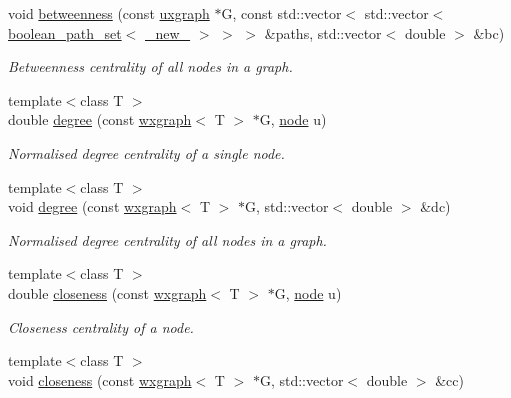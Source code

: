 \begin{DoxyCompactItemize}
void \hyperlink{namespacelgraph_1_1networks_1_1metrics_1_1centralities_ae8016a7511fd3982f986670283cc048c}{betweenness} (const \hyperlink{classlgraph_1_1uxgraph}{uxgraph} $\ast$G, const std\+::vector$<$ std\+::vector$<$ \hyperlink{namespacelgraph_afad432931ba600ab1628d5c9595986c5}{boolean\+\_\+path\+\_\+set}$<$ \hyperlink{namespacelgraph_a2836f966c1c36b43da337d8907728ec0}{\+\_\+new\+\_\+} $>$ $>$ $>$ \&paths, std\+::vector$<$ double $>$ \&bc)
\begin{DoxyCompactList}\small\item\em Betweenness centrality of all nodes in a graph. \end{DoxyCompactList}\item 
{\footnotesize template$<$class T $>$ }\\double \hyperlink{namespacelgraph_1_1networks_1_1metrics_1_1centralities_ab069253de07dc54020e9d6cc1a27a6c8}{degree} (const \hyperlink{classlgraph_1_1wxgraph}{wxgraph}$<$ T $>$ $\ast$G, \hyperlink{namespacelgraph_a397169dd66adf725210a30fb7251773e}{node} u)
\begin{DoxyCompactList}\small\item\em Normalised degree centrality of a single node. \end{DoxyCompactList}\item 
{\footnotesize template$<$class T $>$ }\\void \hyperlink{namespacelgraph_1_1networks_1_1metrics_1_1centralities_a20747beaa4dd97bc96cf153afecc464e}{degree} (const \hyperlink{classlgraph_1_1wxgraph}{wxgraph}$<$ T $>$ $\ast$G, std\+::vector$<$ double $>$ \&dc)
\begin{DoxyCompactList}\small\item\em Normalised degree centrality of all nodes in a graph. \end{DoxyCompactList}\item 
{\footnotesize template$<$class T $>$ }\\double \hyperlink{namespacelgraph_1_1networks_1_1metrics_1_1centralities_a641608dcaecba5d3636237bd15da2e96}{closeness} (const \hyperlink{classlgraph_1_1wxgraph}{wxgraph}$<$ T $>$ $\ast$G, \hyperlink{namespacelgraph_a397169dd66adf725210a30fb7251773e}{node} u)
\begin{DoxyCompactList}\small\item\em Closeness centrality of a node. \end{DoxyCompactList}\item 
{\footnotesize template$<$class T $>$ }\\void \hyperlink{namespacelgraph_1_1networks_1_1metrics_1_1centralities_a070b4de5aa7832b07c860e9527ad5526}{closeness} (const \hyperlink{classlgraph_1_1wxgraph}{wxgraph}$<$ T $>$ $\ast$G, std\+::vector$<$ double $>$ \&cc)

\end{DoxyCompactItemize}
